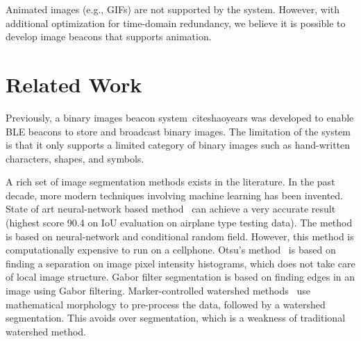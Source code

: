 
Animated images (e.g., GIFs) are not supported by the system. However, with additional optimization for time-domain redundancy, we believe it is possible to develop image beacons that supports animation.


\section{Related Work}
\label{sec:related}


Previously, a binary images beacon system~cite{shaoyears} was developed to enable BLE beacons to store and broadcast binary images. The limitation of the system is that it only supports a limited category of binary images such as hand-written characters, shapes, and symbols.

A rich set of image segmentation methods exists in the literature. In the past decade, more modern techniques involving machine learning has been invented. State of art neural-network based method~\cite{zheng2015conditional} can achieve a very accurate result (highest score 90.4 on IoU evaluation on airplane type testing data). The method is based on neural-network and conditional random field. However, this method is computationally expensive to run on a cellphone. Otsu's method~\cite{otsu1975threshold} is based on finding a separation on image pixel intensity histograms, which does not take care of local image structure. Gabor filter segmentation is based on finding edges in an image using Gabor filtering. Marker-controlled watershed methods~\cite{parvati2009image} use mathematical morphology to pre-process the data, followed by a watershed segmentation. This avoids over segmentation, which is a weakness of traditional watershed method.

